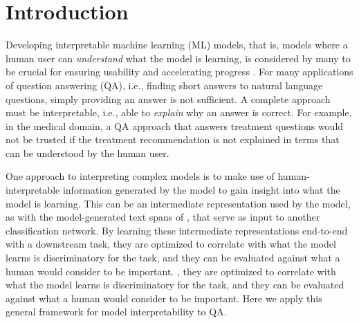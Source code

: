 \section{Introduction}
\label{sec-emnlp2017:intro}

Developing interpretable machine learning (ML) models, that is, models where a human user can \emph{understand} what the model is learning, is considered by many to be crucial for ensuring usability and accelerating progress \cite{craven1996extracting,Kim2015MindTG, letham2015interpretable, Ribeiro2016WhySI}.  
For many applications of question answering (QA), i.e., finding short answers to natural language questions, simply providing an answer is not sufficient. A complete approach must be interpretable, i.e., able to {\em explain} why an answer is correct. 
For example, in the medical domain, a QA approach that answers treatment questions would not be trusted if the treatment recommendation is not explained in terms that can be understood by the human user. 


One approach to interpreting complex models is to make use of human-interpretable information %
 generated by the model to gain insight into what the model is learning.  This can be an intermediate representation used by the model, as with the model-generated text spans of \citet{Lei2016RationalizingNP}, that serve as input to another classification network.  
By learning these intermediate representations end-to-end with a downstream task, they are optimized to correlate with what the model learns is discriminatory for the task, and they can be evaluated against what a human would consider to be important.
, they are optimized to correlate with what the model learns is discriminatory for the task, and they can be evaluated against what a human would consider to be important.
Here we apply this general framework for model interpretability to QA.


